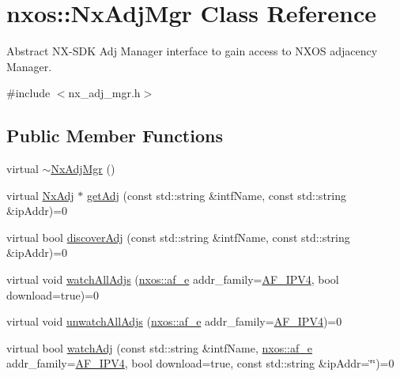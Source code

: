 \hypertarget{classnxos_1_1_nx_adj_mgr}{}\section{nxos\+:\+:Nx\+Adj\+Mgr Class Reference}
\label{classnxos_1_1_nx_adj_mgr}


Abstract N\+X-\/\+S\+DK Adj Manager interface to gain access to N\+X\+OS adjacency Manager.  




{\ttfamily \#include $<$nx\+\_\+adj\+\_\+mgr.\+h$>$}

\subsection*{Public Member Functions}
\begin{DoxyCompactItemize}
\item 
virtual \mbox{\hyperlink{classnxos_1_1_nx_adj_mgr_a771d390eda9cac623c3b8f9452721da5}{$\sim$\+Nx\+Adj\+Mgr}} ()
\item 
virtual \mbox{\hyperlink{classnxos_1_1_nx_adj}{Nx\+Adj}} $\ast$ \mbox{\hyperlink{classnxos_1_1_nx_adj_mgr_a0e3f6888c7c34531ff846c359195259e}{get\+Adj}} (const std\+::string \&intf\+Name, const std\+::string \&ip\+Addr)=0
\item 
virtual bool \mbox{\hyperlink{classnxos_1_1_nx_adj_mgr_a9c347e5836f0ec686fe6605a41fbef5e}{discover\+Adj}} (const std\+::string \&intf\+Name, const std\+::string \&ip\+Addr)=0
\item 
virtual void \mbox{\hyperlink{classnxos_1_1_nx_adj_mgr_a2d0bc4dfa5a270ff464238a59c613993}{watch\+All\+Adjs}} (\mbox{\hyperlink{namespacenxos_a3a667f48b94db10aa398940dc5bf72d7}{nxos\+::af\+\_\+e}} addr\+\_\+family=\mbox{\hyperlink{namespacenxos_a3a667f48b94db10aa398940dc5bf72d7a038f37de02a2c9ee1acbc4e184583628}{A\+F\+\_\+\+I\+P\+V4}}, bool download=true)=0
\item 
virtual void \mbox{\hyperlink{classnxos_1_1_nx_adj_mgr_aa3a1b51dc9fd549e2ef1ac1928030883}{unwatch\+All\+Adjs}} (\mbox{\hyperlink{namespacenxos_a3a667f48b94db10aa398940dc5bf72d7}{nxos\+::af\+\_\+e}} addr\+\_\+family=\mbox{\hyperlink{namespacenxos_a3a667f48b94db10aa398940dc5bf72d7a038f37de02a2c9ee1acbc4e184583628}{A\+F\+\_\+\+I\+P\+V4}})=0
\item 
virtual bool \mbox{\hyperlink{classnxos_1_1_nx_adj_mgr_ae8bd120a58a32548d68a4327e9c26459}{watch\+Adj}} (const std\+::string \&intf\+Name, \mbox{\hyperlink{namespacenxos_a3a667f48b94db10aa398940dc5bf72d7}{nxos\+::af\+\_\+e}} addr\+\_\+family=\mbox{\hyperlink{namespacenxos_a3a667f48b94db10aa398940dc5bf72d7a038f37de02a2c9ee1acbc4e184583628}{A\+F\+\_\+\+I\+P\+V4}}, bool download=true, const std\+::string \&ip\+Addr=\char`\"{}\char`\"{})=0

\end{DoxyCompactItemize}
